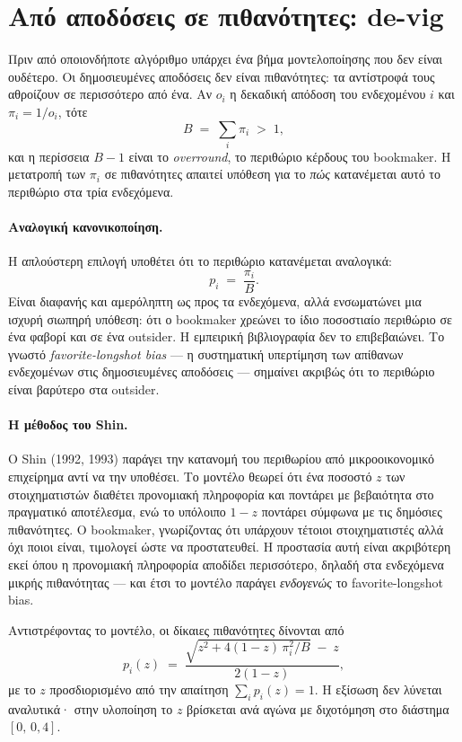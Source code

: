 \documentclass[12pt,a4paper,oneside]{report}
\renewcommand{\_}{\oldunderscore\allowbreak}
\theoremstyle{definition}
\theoremstyle{plain}
\theoremstyle{remark}
\begin{document}
\section{Από αποδόσεις σε πιθανότητες: de-vig}
\label{sec:devig-theory}

Πριν από οποιονδήποτε αλγόριθμο υπάρχει ένα βήμα μοντελοποίησης που δεν είναι ουδέτερο. Οι
δημοσιευμένες αποδόσεις δεν είναι πιθανότητες: τα αντίστροφά τους αθροίζουν σε περισσότερο
από ένα. Αν $o_i$ η δεκαδική απόδοση του ενδεχομένου $i$ και $\pi_i = 1/o_i$, τότε
\[
B \;=\; \sum_{i} \pi_i \;>\; 1,
\]
και η περίσσεια $B-1$ είναι το \emph{overround}, το περιθώριο κέρδους του bookmaker. Η
μετατροπή των $\pi_i$ σε πιθανότητες απαιτεί υπόθεση για το \emph{πώς} κατανέμεται αυτό το
περιθώριο στα τρία ενδεχόμενα.

\paragraph{Αναλογική κανονικοποίηση.} Η απλούστερη επιλογή υποθέτει ότι το περιθώριο
κατανέμεται αναλογικά:
\[
p_i \;=\; \frac{\pi_i}{B}.
\]
Είναι διαφανής και αμερόληπτη ως προς τα ενδεχόμενα, αλλά ενσωματώνει μια ισχυρή σιωπηρή
υπόθεση: ότι ο bookmaker χρεώνει το ίδιο ποσοστιαίο περιθώριο σε ένα φαβορί και σε ένα
outsider. Η εμπειρική βιβλιογραφία δεν το επιβεβαιώνει. Το γνωστό \emph{favorite-longshot
bias} --- η συστηματική υπερτίμηση των απίθανων ενδεχομένων στις δημοσιευμένες αποδόσεις ---
σημαίνει ακριβώς ότι το περιθώριο είναι βαρύτερο στα outsider.

\paragraph{Η μέθοδος του Shin.} Ο Shin (1992, 1993) παράγει την κατανομή του περιθωρίου από
μικροοικονομικό επιχείρημα αντί να την υποθέσει. Το μοντέλο θεωρεί ότι ένα ποσοστό $z$ των
στοιχηματιστών διαθέτει προνομιακή πληροφορία και ποντάρει με βεβαιότητα στο πραγματικό
αποτέλεσμα, ενώ το υπόλοιπο $1-z$ ποντάρει σύμφωνα με τις δημόσιες πιθανότητες. Ο bookmaker,
γνωρίζοντας ότι υπάρχουν τέτοιοι στοιχηματιστές αλλά όχι ποιοι είναι, τιμολογεί ώστε να
προστατευθεί. Η προστασία αυτή είναι ακριβότερη εκεί όπου η προνομιακή πληροφορία αποδίδει
περισσότερο, δηλαδή στα ενδεχόμενα μικρής πιθανότητας --- και έτσι το μοντέλο παράγει
\emph{ενδογενώς} το favorite-longshot bias.

Αντιστρέφοντας το μοντέλο, οι δίκαιες πιθανότητες δίνονται από
\[
p_i(z) \;=\; \frac{\sqrt{z^2 + 4(1-z)\,\pi_i^2/B} \;-\; z}{2(1-z)},
\]
με το $z$ προσδιορισμένο από την απαίτηση $\sum_i p_i(z) = 1$. Η εξίσωση δεν λύνεται
αναλυτικά· στην υλοποίηση το $z$ βρίσκεται ανά αγώνα με διχοτόμηση στο διάστημα
$[0,\,0{,}4]$.
\end{document}

